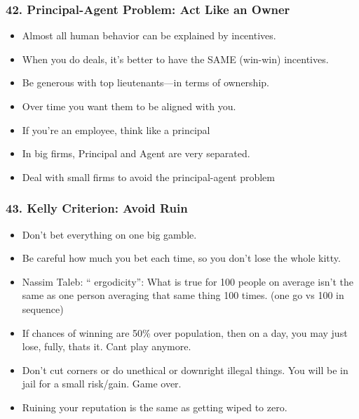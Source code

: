 \begin{frame}[fragile]
\frametitle{42. Principal-Agent Problem: Act Like an Owner}
\begin{itemize}
\item Almost all human behavior can be explained by incentives.
\item When you do deals, it’s better to have the SAME (win-win) incentives.
\item Be generous with top lieutenants—in terms of ownership.
\item Over time you want them to be aligned with you.
\item If you’re an employee, think like a principal
\item In big firms, Principal and Agent are very separated. 
\item Deal with small firms to avoid the principal-agent problem
\end{itemize}
\end{frame}


\begin{frame}[fragile]
\frametitle{43. Kelly Criterion: Avoid Ruin}
\begin{itemize}
\item Don’t bet everything on one big gamble. 
\item Be careful how much you bet each time, so you don’t lose the whole kitty.
\item Nassim Taleb: `` ergodicity'': What is true for 100 people on average isn’t the same as one person averaging that same thing 100 times. (one go vs 100 in sequence)
\item If chances of winning are 50\% over population, then on a day, you may just lose, fully, thats it. Cant play anymore.
\item Don't cut corners or do unethical or downright illegal things. You will be in jail for a small risk/gain. Game over.
\item Ruining your reputation is the same as getting wiped to zero.
\end{itemize}
\end{frame}

